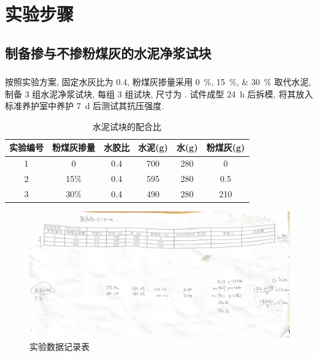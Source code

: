 
\section{实验步骤}

\subsection{制备掺与不掺粉煤灰的水泥净浆试块}

\subsubsection{}
按照实验方案, 固定水灰比为 \num{0.4}, 粉煤灰掺量采用 \qtylist{0; 15; 30}{\percent} 取代水泥, 制备 3 组水泥净浆试块, 每组 3 组试块, 尺寸为 .
试件成型 \SI{24}{\hour} 后拆模, 将其放入标准养护室中养护 \SI{7}{\day} 后测试其抗压强度.
\begin{table}[!t]
    \centering
    \caption{水泥试块的配合比}
    \begin{tabular}{|c|c|c|c|c|c|}
    \hline
    实验编号 & 粉煤灰掺量 & 水胶比 & 水泥(g) & 水(g) & 粉煤灰(g) \\ \hline
    1    & 0      & 0.4 & 700   & 280  & 0      \\ \hline
    2    & 15\%   & 0.4 & 595   & 280  & 0.5    \\ \hline
    3    & 30\%   & 0.4 & 490   & 280  & 210    \\ \hline
    \end{tabular}
    
\end{table}
\begin{figure}
    \centering
    
    \includegraphics[width = 0.7 \linewidth]{figures/exp1/record table.png}
    \caption{实验数据记录表}
\end{figure}


